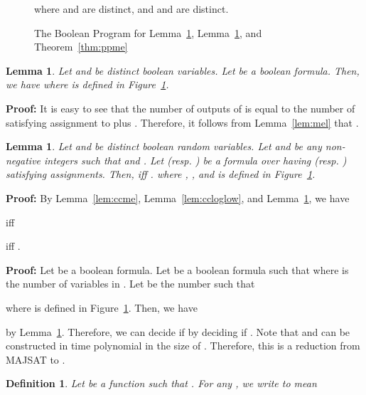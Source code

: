\documentclass{llncs}
\newtheorem{definition}[theorem]{Definition}
\newtheorem{lemma}[theorem]{Lemma}
\newenvironment{proof}{\noindent\rm{\bf Proof:}}{\hbox{}\vspace*{0.2\baselineskip}}
\newenvironment{reftheorem}[1]{\begin{trivlist}\item[\hskip
      \labelsep{\bf Theorem #1.}]\it}{\end{trivlist}}
\begin{document}
\begin{figure}[t]

where  and  are distinct, and  and  are
distinct.
\caption{The Boolean Program for Lemma~\ref{lem:tme}, Lemma~\ref{lem:memonotone}, and Theorem~\ref{thm:ppme}}
\label{fig:boolenc2}
\end{figure}

\begin{lemma}
\label{lem:tme}
Let  and  be distinct boolean variables.  Let  be
a boolean formula.  Then, we have  where  is defined in
Figure~\ref{fig:boolenc2}.
\end{lemma}
\begin{proof}
  It is easy to see that the number of outputs of  is equal
  to the number of satisfying assignment to  plus .
  Therefore, it follows from Lemma~\ref{lem:mel} that .
\end{proof}

\begin{lemma}
\label{lem:memonotone}
Let  and  be distinct boolean random variables.  Let 
and  be any non-negative integers such that 
and .  Let  (resp. ) be a formula
over  having  (resp. ) satisfying assignments. Then,
 iff .  where , , and  is defined in
Figure~\ref{fig:boolenc2}.
\end{lemma}
\begin{proof}
  By Lemma~\ref{lem:ccme}, Lemma~\ref{lem:ccloglow}, and
  Lemma~\ref{lem:tme}, we have

iff

iff
.
\end{proof}

\begin{reftheorem}{\ref{thm:ppme}}

 \end{reftheorem}
\begin{proof}
  Let  be a boolean formula.  Let  be a boolean formula
  such that  where  is the number of
  variables in .  Let  be the number such that

where  is defined in Figure~\ref{fig:boolenc2}.
Then, we have

by Lemma~\ref{lem:memonotone}.  Therefore, we can decide if
 by deciding if .
Note that  and  can be constructed in time polynomial in
the size of .  Therefore, this is a reduction from
\textrm{MAJSAT} to .
\end{proof}

\begin{definition}
  Let  be a function such that .  For any , we write  to mean

\end{definition}
\end{document}
